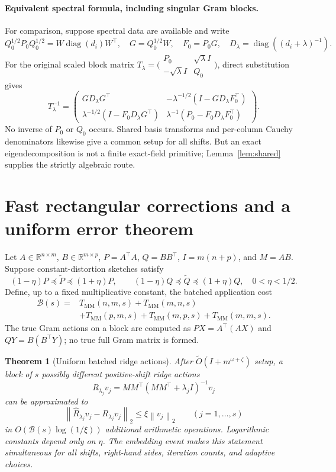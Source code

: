 \documentclass[11pt]{article}
\newtheorem{theorem}{Theorem}
\newcommand{\R}{\mathbb R}
\newcommand{\norm}[1]{\left\lVert#1\right\rVert}
\newcommand{\MM}{T_{\mathrm{MM}}}
\newcommand{\tO}{\widetilde O}
\newcommand{\diag}{\operatorname{diag}}
\begin{document}
\paragraph{Equivalent spectral formula, including singular Gram blocks.}
For comparison, suppose spectral data are available and write
\[
 Q_0^{1/2}P_0Q_0^{1/2}=W\diag(d_i)W^\top,
 \quad G=Q_0^{1/2}W,\quad F_0=P_0G,\quad
 D_\lambda=\diag((d_i+\lambda)^{-1}).
\]
For the original scaled block matrix
\(T_\lambda=\bigl(\begin{smallmatrix}P_0&\sqrt\lambda I\\
-\sqrt\lambda I&Q_0\end{smallmatrix}\bigr)\), direct substitution gives
\[
 T_\lambda^{-1}=
 \begin{pmatrix}
 GD_\lambda G^\top&
 -\lambda^{-1/2}(I-GD_\lambda F_0^\top)\\
 \lambda^{-1/2}(I-F_0D_\lambda G^\top)&
 \lambda^{-1}(P_0-F_0D_\lambda F_0^\top)
 \end{pmatrix}.
\]
No inverse of \(P_0\) or \(Q_0\) occurs. Shared basis transforms
and per-column Cauchy denominators likewise give a common setup for all
shifts. But an exact eigendecomposition is not a finite exact-field
primitive; Lemma~\ref{lem:shared} supplies the strictly algebraic route.

\section{Fast rectangular corrections and a uniform error theorem}
Let \(A\in\R^{n\times m}\), \(B\in\R^{m\times p}\),
\(P=A^\top A\), \(Q=BB^\top\), \(I=m(n+p)\), and
\(M=AB\). Suppose constant-distortion sketches satisfy
\[
 (1-\eta)P\preceq\widetilde P\preceq(1+\eta)P,
 \qquad
 (1-\eta)Q\preceq\widetilde Q\preceq(1+\eta)Q,
 \quad 0<\eta<1/2.
\]
Define, up to a fixed multiplicative constant, the batched application cost
\begin{align*}
 \mathcal B(s)={}&\MM(n,m,s)+\MM(m,n,s)\\
 &+\MM(p,m,s)+\MM(m,p,s)+\MM(m,m,s).
\end{align*}
The true Gram actions on a block are computed as
\(PX=A^\top(AX)\) and \(QY=B(B^\top Y)\); no true full Gram
matrix is formed.

\begin{theorem}[Uniform batched ridge actions]\label{thm:batch}
After \(\tO(I+m^{\omega+\zeta})\) setup, a block of \(s\)
possibly different positive-shift ridge actions
\[
 R_{\lambda_j}v_j=
 MM^\top(MM^\top+\lambda_j I)^{-1}v_j
\]
can be approximated to
\[
 \norm{\widehat R_{\lambda_j}v_j-R_{\lambda_j}v_j}_2
 \le\xi\norm{v_j}_2\qquad(j=1,\ldots,s)
\]
in \(O(\mathcal B(s)\log(1/\xi))\) additional arithmetic
operations. Logarithmic constants depend only on \(\eta\).
The embedding event makes this statement simultaneous for all shifts,
right-hand sides, iteration counts, and adaptive choices.
\end{theorem}
\end{document}

